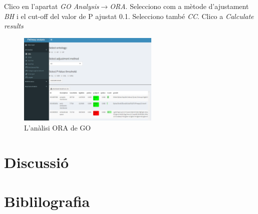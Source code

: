 \documentclass[]{article}
\begin{document}
Clico en l'apartat \textit{GO Analysis}$\rightarrow$\textit{ORA}. Selecciono com a mètode d'ajustament \textit{BH} i el cut-off del valor de P ajustat 0.1. Selecciono també \textit{CC}. Clico a \textit{Calculate results}
\begin{figure}[H]
\centering
\includegraphics[width=0.6\textwidth]{Estudi1_Fig13_GO.png} 
\caption{L'anàlisi ORA de GO}
\end{figure}

\section{Discussió}

\section*{Biblilografia}
\renewcommand{\section}[2]{}%


\end{document}
